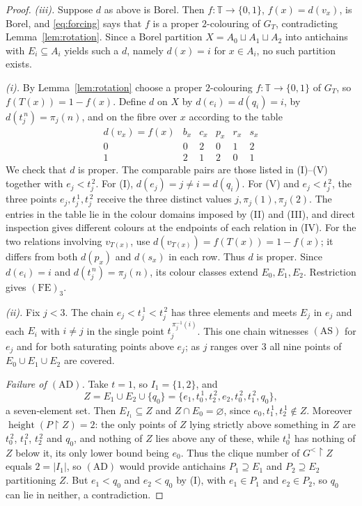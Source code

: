 \documentclass[11pt,reqno]{amsart}
\theoremstyle{plain}
\theoremstyle{definition}
\theoremstyle{remark}
\newcommand{\restr}{\mathbin{\upharpoonright}}
\newcommand{\hgt}{\operatorname{height}}
\newcommand{\T}{\mathbb T}
\begin{document}
\begin{proof}
\emph{(iii).} Suppose $d$ as above is Borel. Then $f:\T\to\{0,1\}$,
$f(x)=d(v_x)$, is Borel, and \eqref{eq:forcing} says that $f$ is a proper
$2$-colouring of $G_T$, contradicting Lemma~\ref{lem:rotation}. Since a Borel
partition $X=A_0\sqcup A_1\sqcup A_2$ into antichains with $E_i\subseteq A_i$
yields such a $d$, namely $d(x)=i$ for $x\in A_i$, no such partition exists.

\emph{(i).} By Lemma~\ref{lem:rotation} choose a proper $2$-colouring
$f:\T\to\{0,1\}$ of $G_T$, so $f(T(x))=1-f(x)$. Define $d$ on $X$ by
$d(e_i)=d(q_i)=i$, by $d(t_j^{\,n})=\pi_j(n)$, and on the fibre over $x$
according to the table
\[
\begin{array}{c|ccccc}
d(v_x)=f(x) & b_x & c_x & p_x & r_x & s_x\\\hline
0 & 0 & 2 & 0 & 1 & 2\\
1 & 2 & 1 & 2 & 0 & 1
\end{array}
\]
We check that $d$ is proper. The comparable pairs are those listed in
(I)--(V) together with $e_j<t_j^{\,2}$. For (I), $d(e_j)=j\neq i=d(q_i)$. For
(V) and $e_j<t_j^{\,2}$, the three points $e_j,t_j^{\,1},t_j^{\,2}$ receive the
three distinct values $j,\pi_j(1),\pi_j(2)$. The entries in the table
lie in the colour domains imposed by (II) and (III), and direct
inspection gives different colours at the endpoints of each relation
in (IV). For the two relations involving $v_{T(x)}$, use
$d(v_{T(x)})=f(T(x))=1-f(x)$; it differs from both $d(p_x)$ and
$d(s_x)$ in each row. Thus $d$ is proper. Since
$d(e_i)=i$ and $d(t_j^{\,n})=\pi_j(n)$, its colour classes extend
$E_0,E_1,E_2$. Restriction gives $\mathrm{(FE)}_3$.

\emph{(ii).} Fix $j<3$. The chain $e_j<t_j^{\,1}<t_j^{\,2}$ has three
elements and meets $E_j$ in $e_j$ and each $E_i$ with $i\neq j$ in the single
point $t_j^{\,\pi_j^{-1}(i)}$. This one chain witnesses $\mathrm{(AS)}$ for
$e_j$ and for both saturating points above $e_j$; as $j$ ranges over $3$ all
nine points of $E_0\cup E_1\cup E_2$ are covered.

\emph{Failure of $\mathrm{(AD)}$.} Take $t=1$, so $I_1=\{1,2\}$, and
\[
Z=E_1\cup E_2\cup\{q_0\}
=\{e_1,t_0^{\,1},t_2^{\,2},e_2,t_0^{\,2},t_1^{\,2},q_0\},
\]
a seven-element set. Then $E_{I_1}\subseteq Z$ and $Z\cap E_0=\varnothing$,
since $e_0,t_1^{\,1},t_2^{\,1}\notin Z$. Moreover $\hgt(P\restr Z)=2$: the
only points of $Z$ lying strictly above something in $Z$ are $t_0^{\,2}$,
$t_1^{\,2}$, $t_2^{\,2}$ and $q_0$, and nothing of $Z$ lies above any of
these, while $t_0^{\,1}$ has nothing of $Z$ below it, its only lower bound
being $e_0$. Thus the clique number of $G^{<}\restr Z$ equals $2=|I_1|$, so
$\mathrm{(AD)}$ would provide antichains $P_1\supseteq E_1$ and
$P_2\supseteq E_2$ partitioning $Z$. But $e_1<q_0$ and $e_2<q_0$ by (I), with
$e_1\in P_1$ and $e_2\in P_2$, so $q_0$ can lie in neither, a contradiction.
\end{proof}
\end{document}
